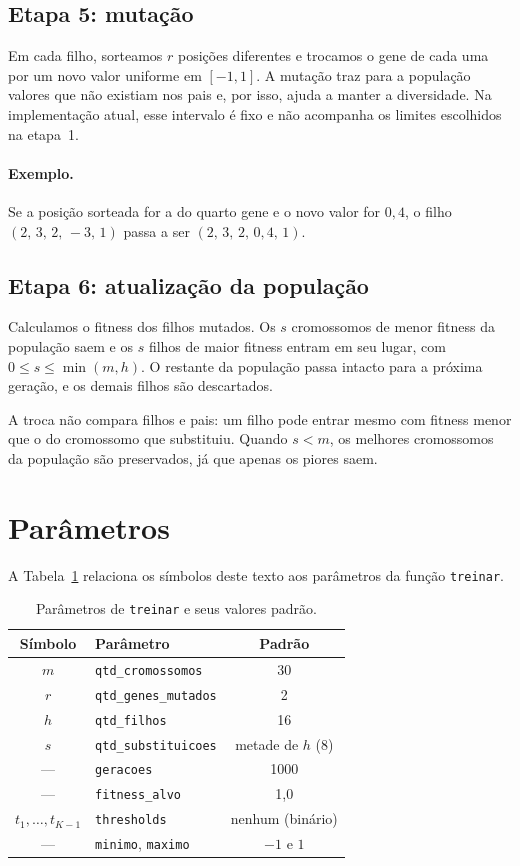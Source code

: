 \documentclass[11pt,a4paper]{article}
\newcommand{\cod}[1]{\texttt{#1}}
\begin{document}
\subsection*{Etapa 5: mutação}

Em cada filho, sorteamos $r$ posições diferentes e trocamos o gene de cada uma por um
novo valor uniforme em $[-1, 1]$. A mutação traz para a população valores que não
existiam nos pais e, por isso, ajuda a manter a diversidade. Na implementação atual,
esse intervalo é fixo e não acompanha os limites escolhidos na etapa~1.

\paragraph{Exemplo.} Se a posição sorteada for a do quarto gene e o novo valor for
$0{,}4$, o filho $(2,\, 3,\, 2,\, -3,\, 1)$ passa a ser $(2,\, 3,\, 2,\, 0{,}4,\, 1)$.

\subsection*{Etapa 6: atualização da população}

Calculamos o fitness dos filhos mutados. Os $s$ cromossomos de menor fitness da
população saem e os $s$ filhos de maior fitness entram em seu lugar, com
$0 \leq s \leq \min(m, h)$. O restante da população passa intacto para a próxima
geração, e os demais filhos são descartados.

A troca não compara filhos e pais: um filho pode entrar mesmo com fitness menor que o
do cromossomo que substituiu. Quando $s < m$, os melhores cromossomos da população são
preservados, já que apenas os piores saem.

\section{Parâmetros}

A Tabela~\ref{tab:parametros} relaciona os símbolos deste texto aos parâmetros da
função \cod{treinar}.

\begin{table}[ht]
\centering
\caption{Parâmetros de \cod{treinar} e seus valores padrão.}
\label{tab:parametros}
\begin{tabular}{clc}
\toprule
Símbolo & Parâmetro & Padrão \\
\midrule
$m$ & \cod{qtd\_cromossomos} & 30 \\
$r$ & \cod{qtd\_genes\_mutados} & 2 \\
$h$ & \cod{qtd\_filhos} & 16 \\
$s$ & \cod{qtd\_substituicoes} & metade de $h$ (8) \\
--- & \cod{geracoes} & 1000 \\
--- & \cod{fitness\_alvo} & 1,0 \\
$t_1, \dots, t_{K-1}$ & \cod{thresholds} & nenhum (binário) \\
--- & \cod{minimo}, \cod{maximo} & $-1$ e $1$ \\
\bottomrule
\end{tabular}
\end{table}
\end{document}

